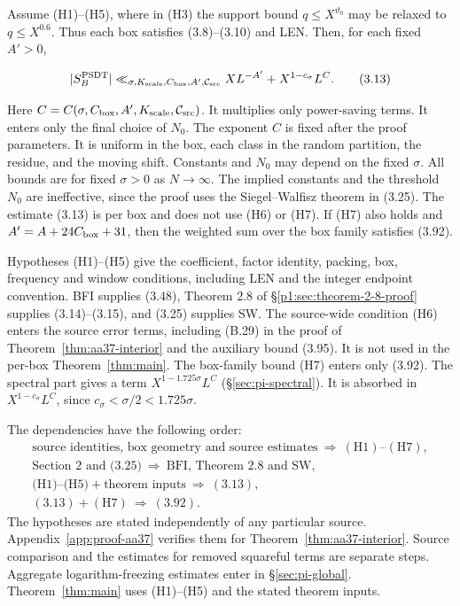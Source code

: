 \begin{theorem}\label{thm:main}
Assume (H1)--(H5), where in (H3) the support bound $q\le X^{\vartheta_0}$
may be relaxed to $q\le X^{0.6}$.
Thus each box satisfies (3.8)--(3.10) and LEN.
Then, for each fixed $A'>0$,

\[
|S_B^{\rm PSDT}|\ll_{\sigma,K_{\rm scale},C_{\rm box},A',\mathcal C_{\rm src}}
 XL^{-A'}+X^{1-c_\sigma}L^C.
\tag{3.13}
\]

Here $C=C(\sigma,C_{\rm box},A',K_{\rm scale},\mathcal C_{\rm src})$.
It multiplies only power-saving terms.
It enters only the final choice of $N_0$.
The exponent $C$ is fixed after the proof parameters.
It is uniform in the box, each class in the random partition, the residue,
and the moving shift.
Constants and $N_0$ may depend on the fixed $\sigma$.
All bounds are for fixed $\sigma>0$ as $N\to\infty$.
The implied constants and the threshold $N_0$ are ineffective, since
the proof uses the Siegel--Walfisz theorem in (3.25).
The estimate (3.13) is per box and does not use (H6) or (H7).
If (H7) also holds and $A'=A+24C_{\rm box}+31$, then the weighted sum
over the box family satisfies (3.92).
\end{theorem}

Hypotheses (H1)--(H5) give the coefficient, factor identity, packing, box,
frequency and window conditions, including LEN and the integer endpoint convention.
BFI \cite[Theorem~0(a)]{BFI86} supplies (3.48), Theorem 2.8 of
\S\ref{p1:sec:theorem-2-8-proof} supplies (3.14)--(3.15), and
(3.25) supplies SW.
The source-wide condition (H6) enters the source error terms, including
(B.29) in the proof of Theorem~\ref{thm:aa37-interior} and the auxiliary
bound (3.95). It is not used in the per-box Theorem~\ref{thm:main}.
The box-family bound (H7) enters only (3.92).
The spectral part gives a term $X^{1-1.725\sigma}L^C$ (\S\ref{sec:pi-spectral}).
It is absorbed in $X^{1-c_\sigma}L^C$, since $c_\sigma<\sigma/2<1.725\sigma$.

The dependencies have the following order:
\[
\begin{gathered}
\text{source identities, box geometry and source estimates}\ \Longrightarrow\ (\mathrm{H1})\text{--}(\mathrm{H7}),\\
\text{Section 2 and (3.25)}\ \Longrightarrow\ \text{BFI, Theorem 2.8 and SW},\\
\text{(H1)--(H5)}+\text{theorem inputs}\ \Longrightarrow\ (3.13),\\
(3.13)+(\mathrm{H7})\ \Longrightarrow\ (3.92).
\end{gathered}
\]
The hypotheses are stated independently of any particular source.
Appendix~\ref{app:proof-aa37} verifies them for
Theorem~\ref{thm:aa37-interior}.
Source comparison and the estimates for removed squareful terms are separate steps.
Aggregate logarithm-freezing estimates enter in \S\ref{sec:pi-global}.
Theorem~\ref{thm:main} uses (H1)--(H5) and the stated theorem inputs.

